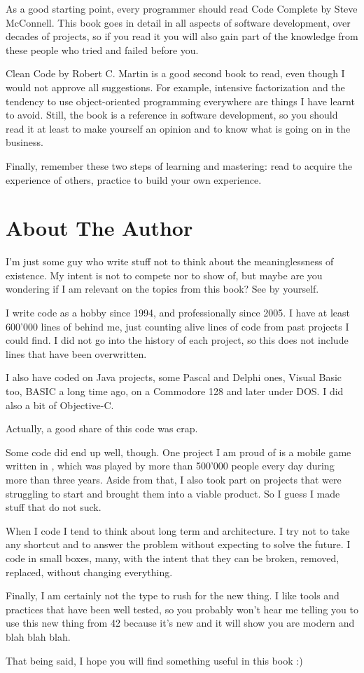 As a good starting point, every programmer should read Code Complete
by Steve McConnell. This book goes in detail in all aspects of
software development, over decades of projects, so if you read it you
will also gain part of the knowledge from these people who tried and
failed before you.

Clean Code by Robert C. Martin is a good second book to read, even
though I would not approve all suggestions. For example, intensive
factorization and the tendency to use object-oriented programming
everywhere are things I have learnt to avoid. Still, the book is a
reference in software development, so you should read it at least to
make yourself an opinion and to know what is going on in the business.

\bigskip

Finally, remember these two steps of learning and mastering: read to
acquire the experience of others, practice to build your own
experience.

\section{About The Author}

I'm just some guy who write stuff not to think about the
meaninglessness of existence. My intent is not to compete nor to show
of, but maybe are you wondering if I am relevant on the topics from
this book? See by yourself.

I write code as a hobby since 1994, and professionally since 2005. I
have at least 600'000 lines of \cpp behind me, just counting alive
lines of code from past projects I could find. I did not go into the
history of each project, so this does not include lines that have been
overwritten.

I also have coded on Java projects, some Pascal and Delphi ones,
Visual Basic too, BASIC a long time ago, on a Commodore 128 and later
under DOS. I did also a bit of Objective-C.

Actually, a good share of this code was crap.

Some code did end up well, though. One project I am proud of is a
mobile game written in \cpp, which was played by more than 500'000
people every day during more than three years. Aside from that, I also
took part on projects that were struggling to start and brought them
into a viable product. So I guess I made stuff that do not suck.

When I code I tend to think about long term and architecture. I try
not to take any shortcut and to answer the problem without expecting
to solve the future. I code in small boxes, many, with the intent that
they can be broken, removed, replaced, without changing everything.

Finally, I am certainly not the type to rush for the new thing. I like
tools and practices that have been well tested, so you probably won't
hear me telling you to use this new thing from \cpp{}42 because it's
new and it will show you are modern and blah blah blah.

\bigskip

That being said, I hope you will find something useful in this book :)
